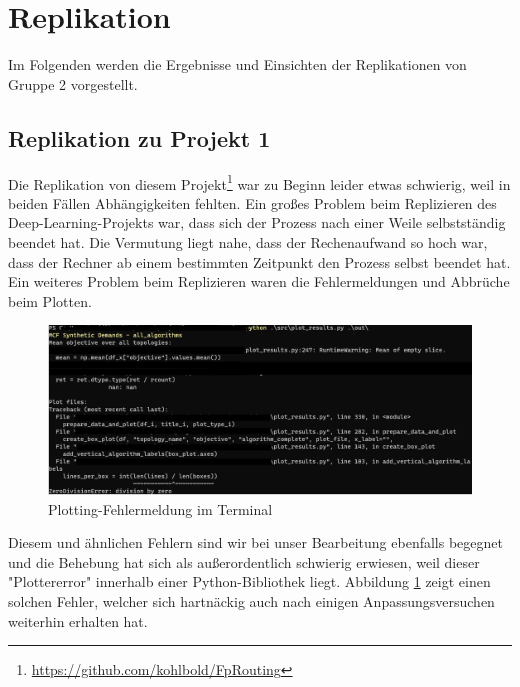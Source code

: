 \documentclass[sigconf, nonacm, review]{acmart}
\begin{document}
\section{Replikation}
Im Folgenden werden die Ergebnisse und Einsichten der Replikationen von Gruppe 2 vorgestellt.
\subsection{Replikation zu Projekt 1}
Die Replikation von diesem Projekt\footnote{\url{https://github.com/kohlbold/FpRouting}} war zu Beginn leider etwas schwierig, weil in beiden F\"allen Abh\"angigkeiten fehlten.
Ein gro\ss es Problem beim Replizieren des Deep-Learning-Projekts war, dass sich der Prozess nach einer Weile selbstst\"andig beendet hat.
Die Vermutung liegt nahe, dass der Rechenaufwand so hoch war, dass der Rechner ab einem bestimmten Zeitpunkt den Prozess selbst beendet hat.
Ein weiteres Problem beim Replizieren waren die Fehlermeldungen und Abbr\"uche beim Plotten. 
\begin{figure}
\centering
\includegraphics[width=\linewidth]{figures/repl_p1_plottererror.png}
\caption{Plotting-Fehlermeldung im Terminal}
\label{fig:repl_p1_plottererrror}
\end{figure}
Diesem und \"ahnlichen Fehlern sind wir bei unser Bearbeitung ebenfalls begegnet und die Behebung hat sich als au\ss erordentlich schwierig erwiesen, weil dieser "Plottererror" innerhalb einer Python-Bibliothek liegt.
Abbildung \ref{fig:repl_p1_plottererrror} zeigt einen solchen Fehler,
welcher sich hartn\"ackig auch nach einigen Anpassungsversuchen weiterhin erhalten hat.
\end{document}
